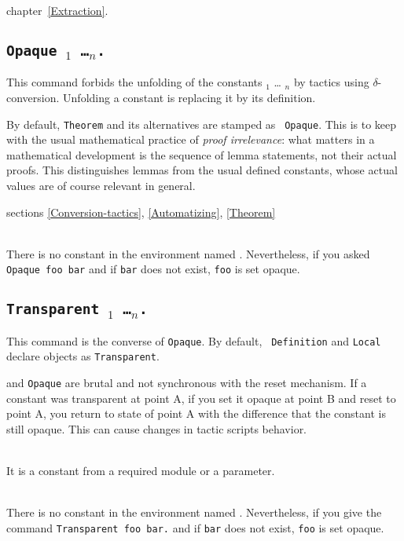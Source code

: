 \SeeAlso chapter~\ref{Extraction}.

\subsection{\tt Opaque \ident$_1$ \dots \ident$_n$.}
\label{Opaque}
This command forbids the unfolding of the constants \ident$_1$ \dots
\ident$_n$  by tactics using $\delta$-conversion. Unfolding a constant
is replacing it by its definition.

By default, {\tt Theorem} and its alternatives are stamped as {\tt
  Opaque}. This is to keep with the usual mathematical practice of
{\em proof irrelevance}: what matters in a mathematical development is
the sequence of lemma statements, not their actual proofs. This
distinguishes lemmas from the usual defined constants, whose actual
values are of course relevant in general.

\SeeAlso sections \ref{Conversion-tactics}, \ref{Automatizing},
\ref{Theorem}

\begin{ErrMsgs}
\item \ident\ \\
    There is no constant in the environment named
    \ident. Nevertheless, if you asked \texttt{Opaque foo bar}
    and if \texttt{bar} does not exist, \texttt{foo} is set opaque.
\end{ErrMsgs}

\subsection{\tt Transparent \ident$_1$ \dots \ident$_n$.}
\label{Transparent}
This command is the converse of {\tt Opaque}. By default, {\tt
  Definition} and {\tt Local} declare objects as {\tt Transparent}.

 and \texttt{Opaque} are brutal and 
not synchronous
with the reset mechanism. If a constant was transparent at point A, if
you set it opaque at point B and reset to point A, you return to state
of point A with the difference that the constant is still opaque. This
can cause changes in tactic scripts behavior.


\begin{ErrMsgs}
\item {}\\
    It is a constant from a required module or a parameter.
\item {\ident} \\
    There is no constant in the environment named
    \ident. Nevertheless, if you give the command \verb|Transparent foo bar.|
    and if \texttt{bar} does not exist, \texttt{foo} is set opaque.
\end{ErrMsgs}

